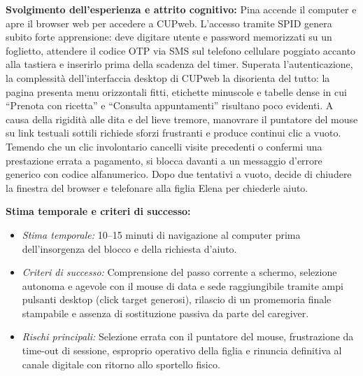 \textbf{Svolgimento dell'esperienza e attrito cognitivo:} Pina accende il computer e apre il browser web per accedere a CUPweb. L'accesso tramite SPID genera subito forte apprensione: deve digitare utente e password memorizzati su un foglietto, attendere il codice OTP via SMS sul telefono cellulare poggiato accanto alla tastiera e inserirlo prima della scadenza del timer. Superata l'autenticazione, la complessità dell'interfaccia desktop di CUPweb la disorienta del tutto: la pagina presenta menu orizzontali fitti, etichette minuscole e tabelle dense in cui \enquote{Prenota con ricetta} e \enquote{Consulta appuntamenti} risultano poco evidenti. A causa della rigidità alle dita e del lieve tremore, manovrare il puntatore del mouse su link testuali sottili richiede sforzi frustranti e produce continui clic a vuoto. Temendo che un clic involontario cancelli visite precedenti o confermi una prestazione errata a pagamento, si blocca davanti a un messaggio d'errore generico con codice alfanumerico. Dopo due tentativi a vuoto, decide di chiudere la finestra del browser e telefonare alla figlia Elena per chiederle aiuto.

\textbf{Stima temporale e criteri di successo:}
\begin{itemize}[leftmargin=*,topsep=1.5pt,itemsep=0.5pt,parsep=0pt]
\item \textit{Stima temporale:} 10--15 minuti di navigazione al computer prima dell'insorgenza del blocco e della richiesta d'aiuto.
\item \textit{Criteri di successo:} Comprensione del passo corrente a schermo, selezione autonoma e agevole con il mouse di data e sede raggiungibile tramite ampi pulsanti desktop (click target generosi), rilascio di un promemoria finale stampabile e assenza di sostituzione passiva da parte del caregiver.
\item \textit{Rischi principali:} Selezione errata con il puntatore del mouse, frustrazione da time-out di sessione, esproprio operativo della figlia e rinuncia definitiva al canale digitale con ritorno allo sportello fisico.
\end{itemize}

